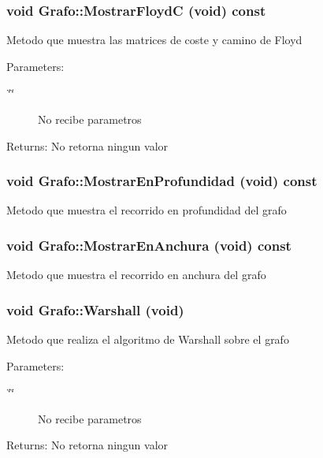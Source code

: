 \subsubsection{\setlength{\rightskip}{0pt plus 5cm}void Grafo::MostrarFloydC (void) const}\label{classGrafo_2c46ec74829edbedd9edd09f0a2d5919}


Metodo que muestra las matrices de coste y camino de Floyd \begin{Desc}
\item[Parameters:]
\begin{description}
\item[{\em \char`\"{}\char`\"{}}]No recibe parametros \end{description}
\end{Desc}
\begin{Desc}
\item[Returns:]No retorna ningun valor \end{Desc}
\subsubsection{\setlength{\rightskip}{0pt plus 5cm}void Grafo::MostrarEnProfundidad (void) const}\label{classGrafo_2612ac12da97ad8c1de4046521dfd41a}


Metodo que muestra el recorrido en profundidad del grafo 
\subsubsection{\setlength{\rightskip}{0pt plus 5cm}void Grafo::MostrarEnAnchura (void) const}\label{classGrafo_8977179d2a324518ae9c5739ed73f3b0}


Metodo que muestra el recorrido en anchura del grafo 
\subsubsection{\setlength{\rightskip}{0pt plus 5cm}void Grafo::Warshall (void)}\label{classGrafo_c8c3d8903ad014b5b6e7540e46a81cb6}


Metodo que realiza el algoritmo de Warshall sobre el grafo \begin{Desc}
\item[Parameters:]
\begin{description}
\item[{\em \char`\"{}\char`\"{}}]No recibe parametros \end{description}
\end{Desc}
\begin{Desc}
\item[Returns:]No retorna ningun valor \end{Desc}
